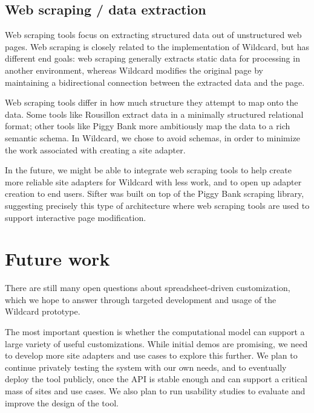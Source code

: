 \documentclass[english,submission]{programming}
\begin{document}
\hypertarget{web-scraping-data-extraction}{%
\subsection{Web scraping / data
extraction}\label{web-scraping-data-extraction}}

Web scraping tools focus on extracting structured data out of
unstructured web pages. Web scraping is closely related to the
implementation of Wildcard, but has different end goals: web scraping
generally extracts static data for processing in another environment,
whereas Wildcard modifies the original page by maintaining a
bidirectional connection between the extracted data and the page.

Web scraping tools differ in how much structure they attempt to map onto
the data. Some tools like Rousillon \autocite{chasins2018} extract data
in a minimally structured relational format; other tools like Piggy Bank
\autocite{huynh2005} more ambitiously map the data to a rich semantic
schema. In Wildcard, we chose to avoid schemas, in order to minimize the
work associated with creating a site adapter.

In the future, we might be able to integrate web scraping tools to help
create more reliable site adapters for Wildcard with less work, and to
open up adapter creation to end users. Sifter was built on top of the
Piggy Bank scraping library, suggesting precisely this type of
architecture where web scraping tools are used to support interactive
page modification.

\hypertarget{future-work}{%
\section{Future work}\label{future-work}}

There are still many open questions about spreadsheet-driven
customization, which we hope to answer through targeted development and
usage of the Wildcard prototype.

The most important question is whether the computational model can
support a large variety of useful customizations. While initial demos
are promising, we need to develop more site adapters and use cases to
explore this further. We plan to continue privately testing the system
with our own needs, and to eventually deploy the tool publicly, once the
API is stable enough and can support a critical mass of sites and use
cases. We also plan to run usability studies to evaluate and improve the
design of the tool.
\end{document}
